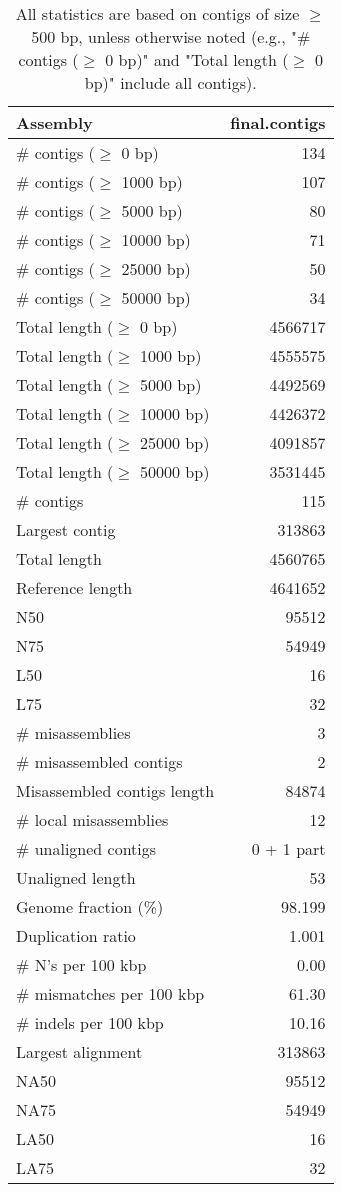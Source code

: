 \documentclass[12pt,a4paper]{article}
\begin{document}
\begin{table}[ht]
\begin{center}
\caption{All statistics are based on contigs of size $\geq$ 500 bp, unless otherwise noted (e.g., "\# contigs ($\geq$ 0 bp)" and "Total length ($\geq$ 0 bp)" include all contigs).}
\begin{tabular}{|l*{1}{|r}|}
\hline
Assembly & final.contigs \\ \hline
\# contigs ($\geq$ 0 bp) & 134 \\ \hline
\# contigs ($\geq$ 1000 bp) & 107 \\ \hline
\# contigs ($\geq$ 5000 bp) & 80 \\ \hline
\# contigs ($\geq$ 10000 bp) & 71 \\ \hline
\# contigs ($\geq$ 25000 bp) & 50 \\ \hline
\# contigs ($\geq$ 50000 bp) & 34 \\ \hline
Total length ($\geq$ 0 bp) & 4566717 \\ \hline
Total length ($\geq$ 1000 bp) & 4555575 \\ \hline
Total length ($\geq$ 5000 bp) & 4492569 \\ \hline
Total length ($\geq$ 10000 bp) & 4426372 \\ \hline
Total length ($\geq$ 25000 bp) & 4091857 \\ \hline
Total length ($\geq$ 50000 bp) & 3531445 \\ \hline
\# contigs & 115 \\ \hline
Largest contig & 313863 \\ \hline
Total length & 4560765 \\ \hline
Reference length & 4641652 \\ \hline
N50 & 95512 \\ \hline
N75 & 54949 \\ \hline
L50 & 16 \\ \hline
L75 & 32 \\ \hline
\# misassemblies & 3 \\ \hline
\# misassembled contigs & 2 \\ \hline
Misassembled contigs length & 84874 \\ \hline
\# local misassemblies & 12 \\ \hline
\# unaligned contigs & 0 + 1 part \\ \hline
Unaligned length & 53 \\ \hline
Genome fraction (\%) & 98.199 \\ \hline
Duplication ratio & 1.001 \\ \hline
\# N's per 100 kbp & 0.00 \\ \hline
\# mismatches per 100 kbp & 61.30 \\ \hline
\# indels per 100 kbp & 10.16 \\ \hline
Largest alignment & 313863 \\ \hline
NA50 & 95512 \\ \hline
NA75 & 54949 \\ \hline
LA50 & 16 \\ \hline
LA75 & 32 \\ \hline
\end{tabular}
\end{center}
\end{table}
\end{document}
